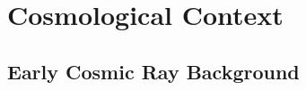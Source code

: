 \section{Cosmological Context}
\label{context}

\subsection{Early Cosmic Ray Background}
\label{crb}
